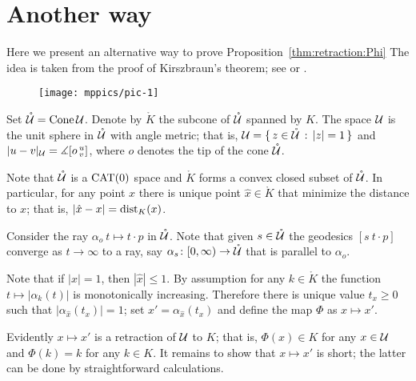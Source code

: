 \documentclass[oneside,a4paper, 12pt]{article}
\begin{document}
\section{Another way}\label{Another way}

Here we present an alternative way to prove Proposition~\ref{thm:retraction:Phi}
The idea is taken from the proof of Kirszbraun's theorem; see \cite[5.1]{akp-kirszbraun} or \cite[9.4.1]{akp}. %

\begin{wrapfigure}{o}{55 mm}
\centering
\texttt{[image: mppics/pic-1]}
\end{wrapfigure}

Set $\mathring{\mathcal{U}}=\mathop{\rm Cone}\nolimits \mathcal{U}$.
Denote by $\mathring{K}$ the subcone of $\mathring{\mathcal{U}}$ spanned by $K$.
The space $\mathcal{U}$ is the unit sphere in $\mathring{\mathcal{U}}$ with angle metric;
that is, $\mathcal{U}=\{\,{z\in \mathring{\mathcal{U}}}\,:\,{|z|=1}\,\}$ and $|u-v|_{\mathcal{U}}=\measuredangle[o\,{}^u_v]$, where $o$ denotes the tip of the cone $\mathring{\mathcal{U}}$.

Note that $\mathring{\mathcal{U}}$ is a $\mathrm{CAT}(0)$ space and $\mathring{K}$ forms a convex closed subset of $\mathring{\mathcal{U}}$.
In particular, for any point $x$ there is unique point $\hat x\in \mathring{K}$
that minimize the distance to $x$;
that is, $|\hat x-x|=\mathop{\rm dist}\nolimits_K(x)$.

Consider the ray $\alpha_o\:t\mapsto t\cdot p$ in  $\mathring{\mathcal{U}}$.
Note that given $s\in \mathring{\mathcal{U}}$
the geodesics $[s\ t\cdot p]$ converge as $t\to\infty$ to a ray, 
say $\alpha_s\colon[0,\infty)\to \mathring{\mathcal{U}}$ that is parallel to $\alpha_o$.

Note that if $|x|=1$, then $|\hat x|\le 1$.
By assumption for any $k\in \mathring{K}$ the function $t\mapsto |\alpha_k(t)|$ is monotonically increasing.
Therefore there is unique value $t_x\ge 0$ such that
$|\alpha_{\hat x}(t_x)|=1$;
set $x'=\alpha_{\hat x}(t_x)$ and define the map $\Phi$ as $x\mapsto x'$.

Evidently $x\mapsto x'$ is a retraction of $\mathcal{U}$ to $K$;
that is,
$\Phi(x)\in K$ for any $x\in \mathcal{U}$
and 
$\Phi(k)=k$ for any $k\in K$.
It remains to show that $x\mapsto x'$ is short; 
the latter can be done by straightforward calculations.
\qeds

{\small\sloppy

\printbibliography[heading=bibintoc]

}
\end{document}
